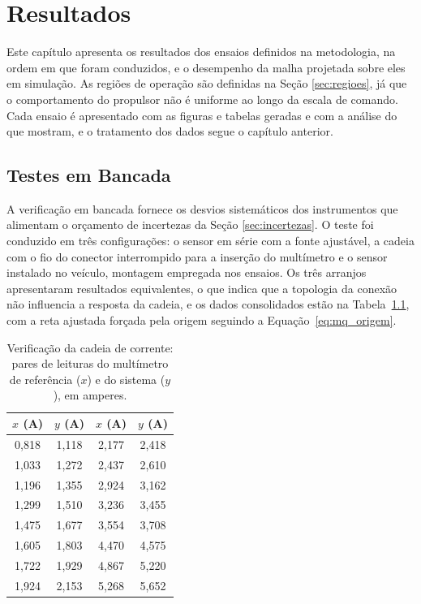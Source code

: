 \chapter{Resultados}
\label{chap:resultados}

Este capítulo apresenta os resultados dos ensaios definidos na metodologia, na ordem em que
foram conduzidos, e o desempenho da malha projetada sobre eles em simulação. As regiões de
operação são definidas na Seção \ref{sec:regioes}, já que o comportamento do propulsor não
é uniforme ao longo da escala de comando. Cada ensaio é apresentado com as figuras e tabelas geradas
e com a análise do que mostram, e o tratamento dos dados segue o capítulo anterior.

\section{Testes em Bancada}
\label{sec:resbancada}

A verificação em bancada fornece os
desvios sistemáticos dos instrumentos que alimentam o orçamento de incertezas da Seção
\ref{sec:incertezas}. O teste foi conduzido em
três configurações: o sensor em série com a fonte ajustável, a cadeia com o fio do conector 
interrompido para a inserção do multímetro e o sensor instalado no veículo, montagem
empregada nos ensaios. Os três arranjos apresentaram resultados equivalentes, o que
indica que a topologia da conexão não influencia a resposta da cadeia, e os dados
consolidados estão na Tabela~\ref{tab:bancada}, com a reta ajustada forçada pela origem
seguindo a Equação~\eqref{eq:mq_origem}.

\begin{table}[htb]
\centering
\caption{Verificação da cadeia de corrente: pares de leituras do multímetro de referência
($x$) e do sistema ($y$), em amperes.}
\label{tab:bancada}
\footnotesize
\renewcommand{\arraystretch}{1.2}
\begin{tabular}{c c c c}
\hline
$x$ (A) & $y$ (A) & $x$ (A) & $y$ (A) \\
\hline
0,818 & 1,118 & 2,177 & 2,418 \\
1,033 & 1,272 & 2,437 & 2,610 \\
1,196 & 1,355 & 2,924 & 3,162 \\
1,299 & 1,510 & 3,236 & 3,455 \\
1,475 & 1,677 & 3,554 & 3,708 \\
1,605 & 1,803 & 4,470 & 4,575 \\
1,722 & 1,929 & 4,867 & 5,220 \\
1,924 & 2,153 & 5,268 & 5,652 \\
\hline
\end{tabular}
\end{table} 

